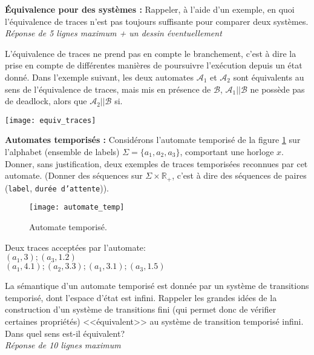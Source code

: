 \documentclass[a4paper]{article}
\begin{document}
\begin{questions}
\question \textbf{Équivalence pour des systèmes : } Rappeler, à l'aide d'un exemple, en quoi l'équivalence de traces n'est
	pas toujours suffisante pour comparer deux systèmes.\\
	\emph{Réponse de 5 lignes maximum + un dessin éventuellement}

\begin{correction}{.8}
  L'équivalence de traces ne prend pas en compte le branchement, c'est
  à dire la prise en compte de différentes manières de poursuivre
  l'exécution depuis un état donné. Dans l'exemple suivant, les deux
  automates $\mathcal{A}_1$ et $\mathcal{A}_2$ sont équivalents au
  sens de l'équivalence de traces, mais mis en présence de $\mathcal{B}$,
  $\mathcal{A}_1||\mathcal{B}$ ne possède pas de deadlock, alors que
  $\mathcal{A}_2||\mathcal{B}$ si.
\begin{center}
\texttt{[image: equiv\_traces]}
\end{center}
\end{correction}

\question \textbf{Automates temporisés : } Considérons l'automate
temporisé de la figure \ref{automateT} sur l'alphabet (ensemble de
labels) $\Sigma=\{a_1,a_2,a_3\}$, comportant une horloge $x$. Donner,
sans justification, deux exemples de traces temporisées reconnues par
cet automate. (Donner des séquences sur $\Sigma \times \mathbb{R}_+$,
c'est à dire des séquences de paires (\texttt{label}, \texttt{durée
  d'attente})). 
	\begin{figure}[!h]
		\begin{center}
		\texttt{[image: automate\_temp]}
		\end{center}
		\caption{Automate temporisé.}
		\label{automateT}
	\end{figure}

\begin{correction}{.8}
Deux traces acceptées par l'automate:\\
$(a_1,3);(a_3,1.2)$\\
$(a_1,4.1);(a_2,3.3);(a_1,3.1);(a_3,1.5)$
\end{correction}

        \question La sémantique d'un automate temporisé est donnée par
        un système de transitions temporisé, dont l'espace d'état est
        infini.  Rappeler les grandes idées de la construction d'un
        système de transitions fini (qui permet donc de vérifier
        certaines propriétés)
	<<équivalent>> au système de transition temporisé infini. Dans quel sens est-il équivalent?\\
	\emph{Réponse de 10 lignes maximum } 


\end{questions}
\end{document}
